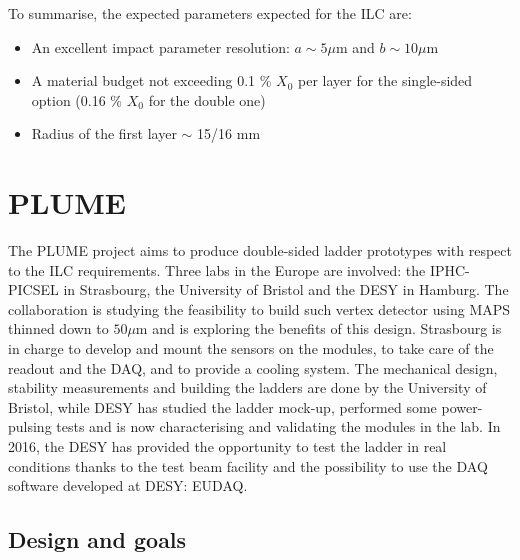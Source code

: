    To summarise, the expected parameters expected for the \gls{ILC} are: 
   \begin{itemize}
     \item An excellent impact parameter resolution: $ a \sim 5 \mu\text{m}$ and $b \sim 10 \mu\text{m}$
     \item A material budget not exceeding 0.1 \% $X_0$ per layer for the single-sided option (0.16 \% $X_0$ for the double one)
     \item Radius of the first layer $\sim$ 15/16 mm
   \end{itemize}

  \section{PLUME}

  The \acrfull{PLUME} project aims to produce double-sided ladder prototypes with respect to the \gls{ILC} requirements.
  Three labs in the Europe are involved: the IPHC-PICSEL in Strasbourg, the University of Bristol and the DESY in Hamburg.
  The collaboration is studying the feasibility to build such vertex detector using \gls{MAPS} thinned down to $50 \mu\text{m}$ and is exploring the benefits of this design.
  Strasbourg is in charge to develop and mount the sensors on the modules, to take care of the readout and the \gls{DAQ}, and to provide a cooling system.
  The mechanical design, stability measurements and building the ladders are done by the University of Bristol, while DESY has studied the ladder mock-up, performed some power-pulsing tests and is now characterising and validating the modules in the lab.
  In 2016, the DESY has provided the opportunity to test the ladder in real conditions thanks to the test beam facility and the possibility to use the \gls{DAQ} software developed at DESY: EUDAQ.

    \subsection{Design and goals}

